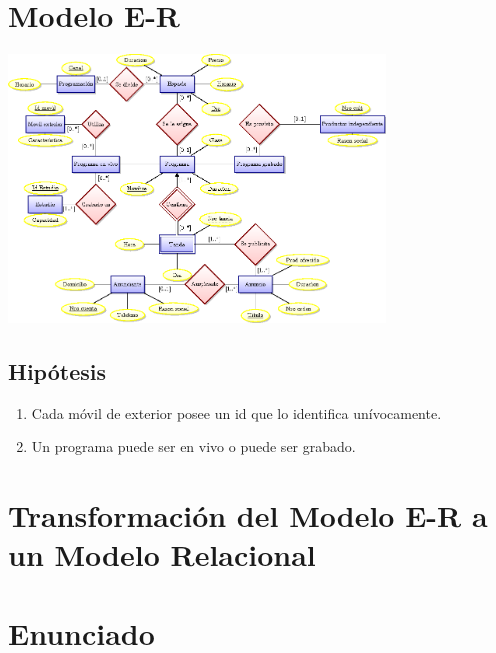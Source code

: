 \documentclass[a4paper,10pt]{article}
\begin{document}

\setcounter{page}{2}

\newpage
\thispagestyle{empty}
\tableofcontents

\newpage
\section{Modelo E-R}
  \includegraphics[width=10cm]{ModeloE-R/ModeloE-R.png}
  
  \subsection{Hip\'otesis}
  \begin{enumerate}
    \item Cada m\'ovil de exterior posee un id que lo identifica un\'ivocamente. 
    \item Un programa puede ser en vivo o puede ser grabado.
  \end{enumerate}

\newpage
\section{Transformaci\'on del Modelo E-R a un Modelo Relacional}

\appendix
\newpage
\section{Enunciado}

\end{document}
